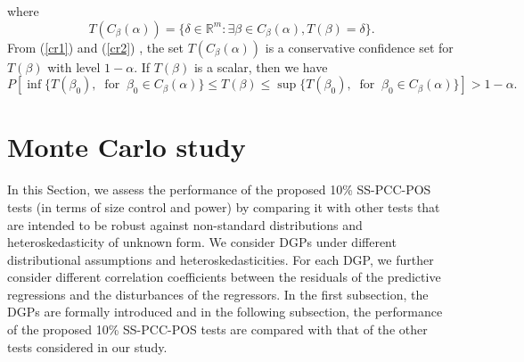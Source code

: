 \documentclass[harvard,11pt]{article}
\begin{document}
where
\begin{equation*}
T(C_{\beta }(\alpha ))=\{\delta \in \mathbb{R}^{m}:\exists \beta \in
C_{\beta }(\alpha ),T(\beta )=\delta \}.
\end{equation*}%
\newline
From (\ref{cr1}) and (\ref{cr2}) , the set $T(C_{\beta }(\alpha ))$ is a
conservative confidence set for $T(\beta )$ with level $1-\alpha $. If $%
T(\beta )$ is a scalar, then we have
\begin{equation*}
P[\inf \{T(\beta _{0}),\;\;\text{for}\;\;\beta _{0}\in C_{\beta
}(\alpha )\}\leq T(\beta )\leq \sup \{T(\beta _{0}),\;\;\text{for}\;\;\beta
_{0}\in C_{\beta }(\alpha )\}]>1-\alpha .
\end{equation*}

\section{Monte Carlo study \label{sec: Monte Carlo study}}
In this Section, we assess the performance of the proposed 10\% SS-PCC-POS tests (in terms of size control and power) by comparing it with other tests that are intended to be robust against non-standard distributions and heteroskedasticity of unknown form. We consider DGPs under different distributional assumptions and heteroskedasticities. For each DGP, we further consider different correlation coefficients between the residuals of the predictive regressions and the disturbances of the regressors. In the first subsection, the DGPs are formally introduced and in the following subsection, the performance of the proposed 10\% SS-PCC-POS tests are compared with that of the other tests considered in our study.  
\end{document}
